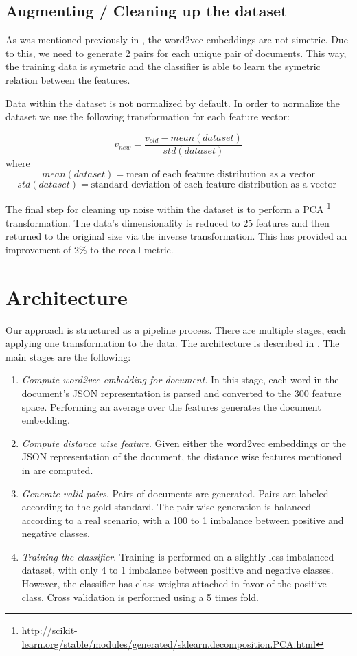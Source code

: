 \subsection{Augmenting / Cleaning up the dataset}
As was mentioned previously in ,
the word2vec embeddings are not simetric. Due to this, we need to generate
2 pairs for each unique pair of documents. This way, the training data is
symetric and the classifier is able to learn the symetric relation between
the features.

Data within the dataset is not normalized by default. In order to normalize the
dataset we use the following transformation for each feature vector:

\[ v_{new} = \frac{v_{old} - mean(dataset)}{std(dataset)} \]
where
\[ mean(dataset) = \mbox{mean of each feature distribution as a vector} \]
\[ std(dataset) = \mbox{standard deviation of each feature distribution as a vector } \]

The final step for cleaning up noise within the dataset is to perform a PCA
\footnote{\url{http://scikit-learn.org/stable/modules/generated/sklearn.decomposition.PCA.html}}
transformation. The data's dimensionality is reduced to 25 features and then returned
to the original size via the inverse transformation. This has provided an
improvement of 2\% to the recall metric.


\section {Architecture}
\label{section:architecture}

Our approach is structured as a pipeline process. There are multiple stages, each
applying one transformation to the data. The architecture is described in
.
The main stages are the following:
\begin {enumerate}
\item
  {\em Compute word2vec embedding for document}. In this stage, each word in the
  document's JSON representation is parsed and converted to the 300 feature space.
  Performing an average over the features generates the document embedding.
\item
  {\em Compute distance wise feature}. Given either the word2vec embeddings or
  the JSON representation of the document, the distance wise features mentioned
  in  are computed.
\item
  {\em Generate valid pairs}. Pairs of documents are generated. Pairs are
  labeled according to the gold standard. The pair-wise generation is balanced
  according to a real scenario, with a 100 to 1 imbalance between positive
  and negative classes.
\item
  {\em Training the classifier}. Training is performed on a slightly less
  imbalanced dataset, with only 4 to 1 imbalance between positive and negative
  classes. However, the classifier has class weights attached in favor
  of the positive class. Cross validation is performed using a 5 times fold.
\end {enumerate}

